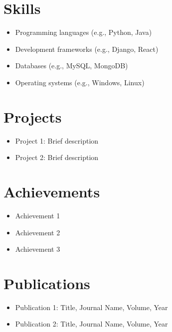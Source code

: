 \documentclass[12pt,a4paper]{article}
\begin{document}
\begin{multicols}{2}[\vskip 1cm]
\section*{Skills} \begin{itemize} \item Programming languages (e.g., Python, Java) \item Development frameworks (e.g., Django, React) \item Databases (e.g., MySQL, MongoDB) \item Operating systems (e.g., Windows, Linux) \end{itemize}

\section*{Projects} \begin{itemize} \item Project 1: Brief description \item Project 2: Brief description \end{itemize}


\section*{Achievements} 
\begin{itemize} 
\item Achievement 1 
\item Achievement 2 
\item Achievement 3 
\end{itemize}

\section*{Publications} 

\begin{itemize} 
\item Publication 1: Title, Journal Name, Volume, Year 
\item Publication 2: Title, Journal Name, Volume, Year 
\end{itemize}

\end{multicols}

\vfill
\end{document}
